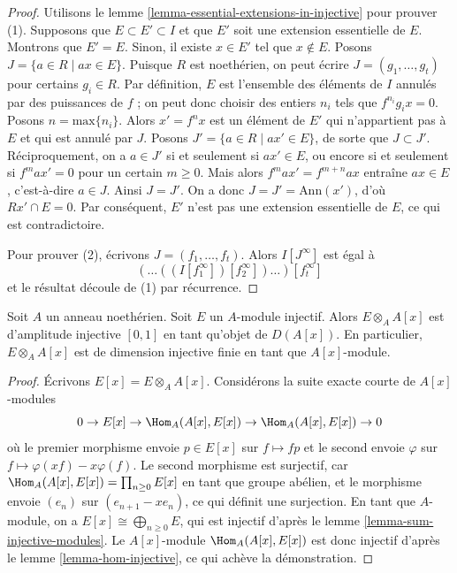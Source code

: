 \begin{proof}
Utilisons le lemme \ref{lemma-essential-extensions-in-injective} pour prouver (1).
Supposons que $E \subset E' \subset I$ et que $E'$ soit une extension essentielle de $E$.
Montrons que $E' = E$. Sinon, il existe $x \in E'$ tel que $x \not \in E$.
Posons $J = \{ a \in R \mid ax \in E\}$. Puisque $R$ est noethérien, on peut écrire $J = (g_1, \ldots, g_t)$
pour certains $g_i \in R$. Par définition, $E$ est l'ensemble des éléments
de $I$ annulés par des puissances de $f$ ; on peut donc choisir
des entiers $n_i$ tels que $f^{n_i}g_ix = 0$.
Posons $n = \mathrm{max}\{ n_i \}$. Alors $x' = f^n x$ est un élément de $E'$
qui n'appartient pas à $E$ et qui est annulé par $J$.
Posons $J' = \{ a \in R \mid ax' \in E \}$, de sorte que $J \subset J'$. Réciproquement, on a $a \in J'$
si et seulement si $ax' \in E$, ou encore si et seulement si $f^m a x' = 0$
pour un certain $m \geq 0$. Mais alors $f^m a x' = f^{m + n} a x$ entraîne $ax \in E$, c'est-à-dire $a \in J$.
Ainsi $J = J'$. On a donc $J = J' = \text{Ann}(x')$, d'où $Rx' \cap E  = 0$.
Par conséquent, $E'$ n'est pas une extension essentielle de $E$,
ce qui est contradictoire.

\medskip\noindent
Pour prouver (2), écrivons $J = (f_1, \ldots, f_t)$. Alors $I[J^\infty]$ est égal à
$$
(\ldots((I[f_1^\infty])[f_2^\infty])\ldots)[f_t^\infty]
$$
et le résultat découle de (1) par récurrence.
\end{proof}

\begin{lemma}
\label{lemma-injective-dimension-over-polynomial-ring}
Soit $A$ un anneau noethérien. Soit $E$ un $A$-module injectif.
Alors $E \otimes_A A[x]$ est d'amplitude injective $[0, 1]$
en tant qu'objet de $D(A[x])$. En particulier, $E \otimes_A A[x]$
est de dimension injective finie en tant que $A[x]$-module.
\end{lemma}

\begin{proof}
Écrivons $E[x] = E \otimes_A A[x]$. Considérons la suite exacte courte de $A[x]$-modules
$$
0 \to E[x] \to \Hom_A(A[x], E[x]) \to \Hom_A(A[x], E[x]) \to 0
$$
où le premier morphisme envoie $p \in E[x]$ sur $f \mapsto fp$ et le second envoie
$\varphi$ sur $f \mapsto \varphi(xf) - x\varphi(f)$.
Le second morphisme est surjectif, car $\Hom_A(A[x], E[x]) = \prod_{n \geq 0} E[x]$ en tant que groupe abélien,
et le morphisme envoie $(e_n)$ sur $(e_{n + 1} - xe_n)$, ce qui définit une surjection.
En tant que $A$-module, on a $E[x] \cong \bigoplus_{n \geq 0} E$,
qui est injectif d'après le lemme \ref{lemma-sum-injective-modules}.
Le $A[x]$-module $\Hom_A(A[x], E[x])$ est donc injectif d'après le lemme \ref{lemma-hom-injective},
ce qui achève la démonstration.
\end{proof}



